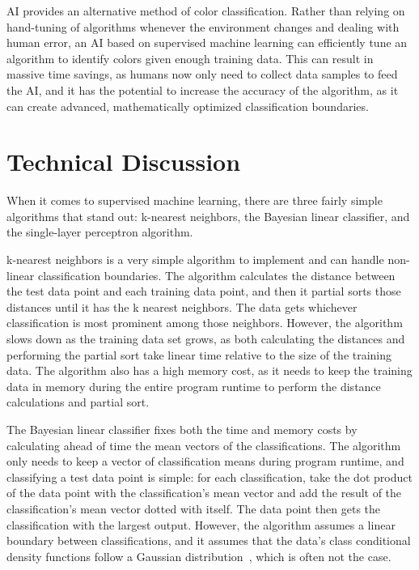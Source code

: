 \documentclass[twoside]{IEEEtran}
\begin{document}
AI provides an alternative method of color classification. Rather than relying on hand-tuning of
algorithms whenever the environment changes and dealing with human error, an AI based on
supervised machine learning can efficiently tune an algorithm to identify colors given enough
training data. This can result in massive time savings, as humans now only need to collect data
samples to feed the AI, and it has the potential to increase the accuracy of the algorithm, as it can
create advanced, mathematically optimized classification boundaries.

\section{Technical Discussion}

When it comes to supervised machine learning, there are three fairly simple algorithms that stand
out: k-nearest neighbors, the Bayesian linear classifier, and the single-layer perceptron algorithm.

k-nearest neighbors is a very simple algorithm to implement and can handle non-linear
classification boundaries. The algorithm calculates the distance between the test data point and
each training data point, and then it partial sorts those distances until it has the k nearest
neighbors. The data gets whichever classification is most prominent among those neighbors.
However, the algorithm slows down as the training data set grows, as both calculating the
distances and performing the partial sort take linear time relative to the size of the training data.
The algorithm also has a high memory cost, as it needs to keep the training data in memory
during the entire program runtime to perform the distance calculations and partial sort.

The Bayesian linear classifier fixes both the time and memory costs by calculating ahead of time the
mean vectors of the classifications. The algorithm only needs to keep a vector of classification means
during program runtime, and classifying a test data point is simple: for each classification, take
the dot product of the data point with the classification's mean vector and add the result of the
classification's mean vector dotted with itself. The data point then gets the classification with the
largest output. However, the algorithm assumes a linear boundary between classifications, and it assumes
that the data's class conditional density functions follow a Gaussian distribution~\cite{farmer}, which
is often not the case.
\end{document}
